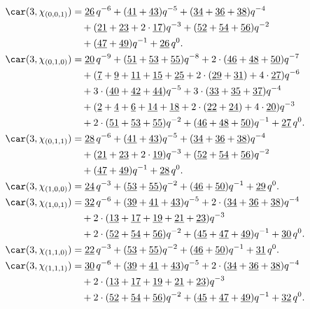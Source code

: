 \begin{align*}
	\car(3,\chi_{(0,0,1)})
	&=\underline{26}\,q^{-6}+(\underline{41}+\underline{43})q^{-5}+(\underline{34}+\underline{36}+\underline{38})q^{-4}\\
	&\quad+(\underline{21}+\underline{23}+2\cdot\underline{17})q^{-3}+(\underline{52}+\underline{54}+\underline{56})q^{-2}\\
	&\quad+(\underline{47}+\underline{49})q^{-1}+\underline{26}\,q^0.\\
	\car(3,\chi_{(0,1,0)})
	&=\underline{20}\,q^{-9}+(\underline{51}+\underline{53}+\underline{55})q^{-8}+2\cdot(\underline{46}+\underline{48}+\underline{50})q^{-7}\\
	&\quad+(\underline{7}+\underline{9}+\underline{11}+\underline{15}+\underline{25}+2\cdot(\underline{29}+\underline{31})+4\cdot\underline{27})q^{-6}\\
	&\quad+3\cdot(\underline{40}+\underline{42}+\underline{44})q^{-5}+3\cdot(\underline{33}+\underline{35}+\underline{37})q^{-4}\\
	&\quad+(\underline{2}+\underline{4}+\underline{6}+\underline{14}+\underline{18}+2\cdot(\underline{22}+\underline{24})+4\cdot\underline{20})q^{-3}\\
	&\quad+2\cdot(\underline{51}+\underline{53}+\underline{55})q^{-2}+(\underline{46}+\underline{48}+\underline{50})q^{-1}+\underline{27}\,q^0.\\
	\car(3,\chi_{(0,1,1)})
	&=\underline{28}\,q^{-6}+(\underline{41}+\underline{43})q^{-5}+(\underline{34}+\underline{36}+\underline{38})q^{-4}\\
	&\quad+(\underline{21}+\underline{23}+2\cdot\underline{19})q^{-3}+(\underline{52}+\underline{54}+\underline{56})q^{-2}\\
	&\quad+(\underline{47}+\underline{49})q^{-1}+\underline{28}\,q^0.\\
	\car(3,\chi_{(1,0,0)})
	&=\underline{24}\,q^{-3}+(\underline{53}+\underline{55})q^{-2}+(\underline{46}+\underline{50})q^{-1}+\underline{29}\,q^0.\\
	\car(3,\chi_{(1,0,1)})
	&=\underline{32}\,q^{-6}+(\underline{39}+\underline{41}+\underline{43})q^{-5}+2\cdot(\underline{34}+\underline{36}+\underline{38})q^{-4}\\
	&\quad+2\cdot(\underline{13}+\underline{17}+\underline{19}+\underline{21}+\underline{23})q^{-3}\\
	&\quad+2\cdot(\underline{52}+\underline{54}+\underline{56})q^{-2}+(\underline{45}+\underline{47}+\underline{49})q^{-1}+\underline{30}\,q^0.\\
	\car(3,\chi_{(1,1,0)})
	&=\underline{22}\,q^{-3}+(\underline{53}+\underline{55})q^{-2}+(\underline{46}+\underline{50})q^{-1}+\underline{31}\,q^0.\\
	\car(3,\chi_{(1,1,1)})
	&=\underline{30}\,q^{-6}+(\underline{39}+\underline{41}+\underline{43})q^{-5}+2\cdot(\underline{34}+\underline{36}+\underline{38})q^{-4}\\
	&\quad+2\cdot(\underline{13}+\underline{17}+\underline{19}+\underline{21}+\underline{23})q^{-3}\\
	&\quad+2\cdot(\underline{52}+\underline{54}+\underline{56})q^{-2}+(\underline{45}+\underline{47}+\underline{49})q^{-1}+\underline{32}\,q^0.
\end{align*}

